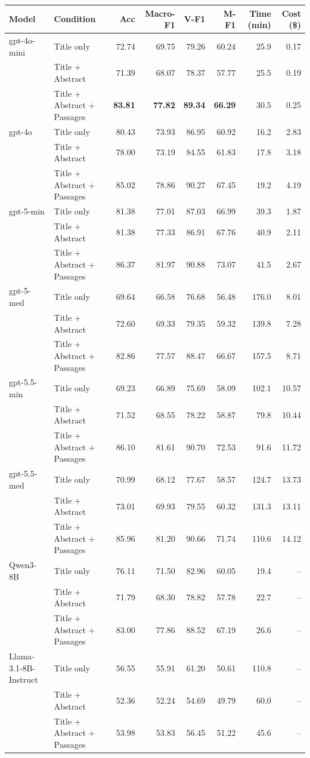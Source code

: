 \begin{tabular}{llrrrrrr}
\toprule
Model & Condition & Acc & Macro-F1 & V-F1 & M-F1 & Time (min) & Cost (\$) \\
\midrule
gpt-4o-mini & Title only & 72.74 & 69.75 & 79.26 & 60.24 & 25.9 & 0.17 \\
 & Title + Abstract & 71.39 & 68.07 & 78.37 & 57.77 & 25.5 & 0.19 \\
 & Title + Abstract + Passages & \textbf{83.81} & \textbf{77.82} & \textbf{89.34} & \textbf{66.29} & 30.5 & 0.25 \\
\midrule
gpt-4o & Title only & 80.43 & 73.93 & 86.95 & 60.92 & 16.2 & 2.83 \\
 & Title + Abstract & 78.00 & 73.19 & 84.55 & 61.83 & 17.8 & 3.18 \\
 & Title + Abstract + Passages & 85.02 & 78.86 & 90.27 & 67.45 & 19.2 & 4.19 \\
\midrule
gpt-5-min & Title only & 81.38 & 77.01 & 87.03 & 66.99 & 39.3 & 1.87 \\
 & Title + Abstract & 81.38 & 77.33 & 86.91 & 67.76 & 40.9 & 2.11 \\
 & Title + Abstract + Passages & 86.37 & 81.97 & 90.88 & 73.07 & 41.5 & 2.67 \\
\midrule
gpt-5-med & Title only & 69.64 & 66.58 & 76.68 & 56.48 & 176.0 & 8.01 \\
 & Title + Abstract & 72.60 & 69.33 & 79.35 & 59.32 & 139.8 & 7.28 \\
 & Title + Abstract + Passages & 82.86 & 77.57 & 88.47 & 66.67 & 157.5 & 8.71 \\
\midrule
gpt-5.5-min & Title only & 69.23 & 66.89 & 75.69 & 58.09 & 102.1 & 10.57 \\
 & Title + Abstract & 71.52 & 68.55 & 78.22 & 58.87 & 79.8 & 10.44 \\
 & Title + Abstract + Passages & 86.10 & 81.61 & 90.70 & 72.53 & 91.6 & 11.72 \\
\midrule
gpt-5.5-med & Title only & 70.99 & 68.12 & 77.67 & 58.57 & 124.7 & 13.73 \\
 & Title + Abstract & 73.01 & 69.93 & 79.55 & 60.32 & 131.3 & 13.11 \\
 & Title + Abstract + Passages & 85.96 & 81.20 & 90.66 & 71.74 & 110.6 & 14.12 \\
\midrule
Qwen3-8B & Title only & 76.11 & 71.50 & 82.96 & 60.05 & 19.4 & -- \\
 & Title + Abstract & 71.79 & 68.30 & 78.82 & 57.78 & 22.7 & -- \\
 & Title + Abstract + Passages & 83.00 & 77.86 & 88.52 & 67.19 & 26.6 & -- \\
\midrule
Llama-3.1-8B-Instruct & Title only & 56.55 & 55.91 & 61.20 & 50.61 & 110.8 & -- \\
 & Title + Abstract & 52.36 & 52.24 & 54.69 & 49.79 & 60.0 & -- \\
 & Title + Abstract + Passages & 53.98 & 53.83 & 56.45 & 51.22 & 45.6 & -- \\
\bottomrule
\end{tabular}
